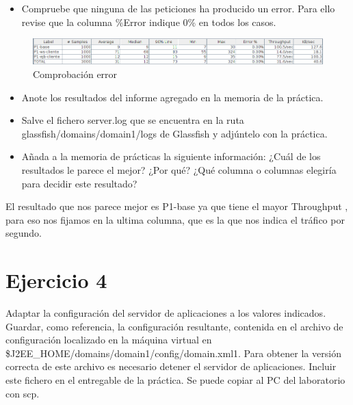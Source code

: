 \documentclass[a4paper, 10pt]{article}
\begin{document}
\begin{mdframed} 
\begin{itemize}
\item Compruebe que ninguna de las peticiones ha producido un error. Para ello revise que la 
columna \%Error indique 0\% en todos los casos. 
\end{itemize} 
\end{mdframed}
\begin{figure}[hbtp]
	 	\centering
	 	\includegraphics[width=1.1\textwidth]{../../p2/pantallazos/ej3_report.png}
	 	\caption{Comprobación error}
\end{figure}
\begin{mdframed}
\begin{itemize}
Una vez que los resultados han sido satisfactorios: 
\item Anote los resultados del informe agregado en la memoria de la práctica. 
\item Salve el fichero server.log que se encuentra en la ruta glassfish/domains/domain1/logs de 
Glassfish y adjúntelo con la práctica. 
\item Añada a la memoria de prácticas la siguiente información: ¿Cuál de los resultados le parece el 
mejor? ¿Por qué? ¿Qué columna o columnas elegiría para decidir este resultado? 
\end{itemize} 
\end{mdframed} 

El resultado que nos parece mejor es P1-base ya que tiene el mayor Throughput , para eso nos fijamos en la ultima columna, que es la que nos indica el tráfico por segundo.

\section{Ejercicio 4}
\begin{mdframed} 
Adaptar la configuración del servidor de aplicaciones a los valores indicados. Guardar, como 
referencia, la configuración resultante, contenida en el archivo de configuración localizado en la máquina 
virtual en \$J2EE_HOME/domains/domain1/config/domain.xml1. Para obtener la versión correcta de este archivo es necesario detener el servidor de aplicaciones. Incluir este fichero en el entregable de la 
práctica. Se puede copiar al PC del laboratorio con scp. 
\end{mdframed}
\end{document}
